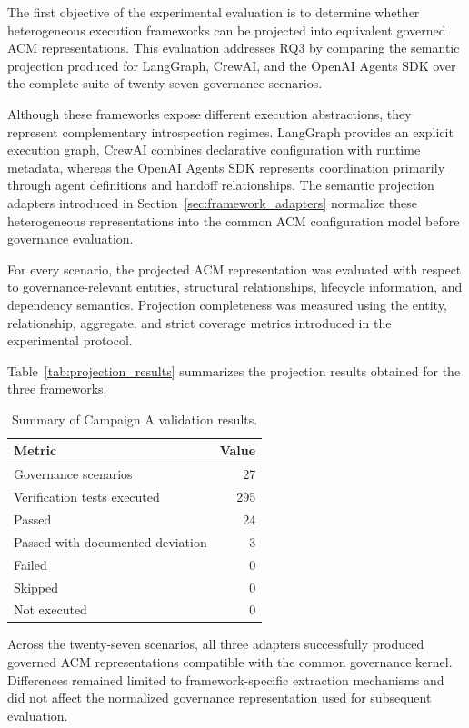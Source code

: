 \documentclass[10pt]{article}
\begin{document}
The first objective of the experimental evaluation is to determine whether heterogeneous execution frameworks can be projected into equivalent governed ACM representations. This evaluation addresses RQ3 by comparing the semantic projection produced for LangGraph, CrewAI, and the OpenAI Agents SDK over the complete suite of twenty-seven governance scenarios.

Although these frameworks expose different execution abstractions, they represent complementary introspection regimes. LangGraph provides an explicit execution graph, CrewAI combines declarative configuration with runtime metadata, whereas the OpenAI Agents SDK represents coordination primarily through agent definitions and handoff relationships. The semantic projection adapters introduced in Section~\ref{sec:framework_adapters} normalize these heterogeneous representations into the common ACM configuration model before governance evaluation.

For every scenario, the projected ACM representation was evaluated with respect to governance-relevant entities, structural relationships, lifecycle information, and dependency semantics. Projection completeness was measured using the entity, relationship, aggregate, and strict coverage metrics introduced in the experimental protocol.

Table~\ref{tab:projection_results} summarizes the projection results obtained for the three frameworks.

\begin{table}[t]
	\centering
	\caption{Summary of Campaign A validation results.}
	\label{tab:campaign_a_summary}
	\small
	\begin{tabular}{lr}
		\toprule
		\textbf{Metric} & \textbf{Value} \\
		\midrule
		Governance scenarios & 27 \\
		Verification tests executed & 295 \\
		Passed & 24 \\
		Passed with documented deviation & 3 \\
		Failed & 0 \\
		Skipped & 0 \\
		Not executed & 0 \\
		\bottomrule
	\end{tabular}
\end{table}

Across the twenty-seven scenarios, all three adapters successfully produced governed ACM representations compatible with the common governance kernel. Differences remained limited to framework-specific extraction mechanisms and did not affect the normalized governance representation used for subsequent evaluation.
\end{document}
